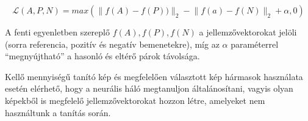 \[ \mathcal{L}(A,P,N) = max \left( \lVert f(A) - f(P)) \rVert_2 - \lVert f(a) - f(N) \rVert_2 + \alpha, 0 \right) \]

A fenti egyenletben szereplő $f(A), f(P), f(N)$ a jellemzővektorokat jelöli (sorra referencia, pozitív és negatív bemenetekre), míg az $\alpha$ paraméterrel ``megnyújtható'' a hasonló és eltérő párok távolsága. 


Kellő mennyiségű tanító kép és megfelelően választott kép hármasok használata esetén elérhető, hogy a neurális háló megtanuljon általánosítani, vagyis olyan képekből is megfelelő jellemzővektorokat hozzon létre, amelyeket nem használtunk a tanítás során. 














